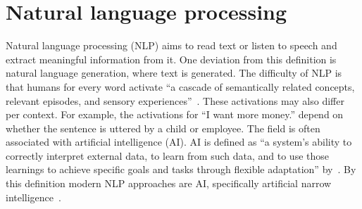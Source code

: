 \section{Natural language processing}
\label{sec:nlp}

Natural language processing (NLP) aims to read text or listen to speech and extract meaningful information from it.
One deviation from this definition is natural language generation, where text is generated.
The difficulty of NLP is that humans for every word activate ``a cascade of semantically related concepts, relevant episodes, and sensory experiences''~\citep{cambria2014jumping}.
These activations may also differ per context.
For example, the activations for ``I want more money.'' depend on whether the sentence is uttered by a child or employee.
The field is often associated with artificial intelligence (AI).
AI is defined as ``a system's ability to correctly interpret external data, to learn from such data, and to use those learnings to achieve specific goals and tasks through flexible adaptation'' by~\citep{kaplan2019siri}.
By this definition modern NLP approaches are AI, specifically artificial narrow intelligence~\citep{kaplan2019siri}.

